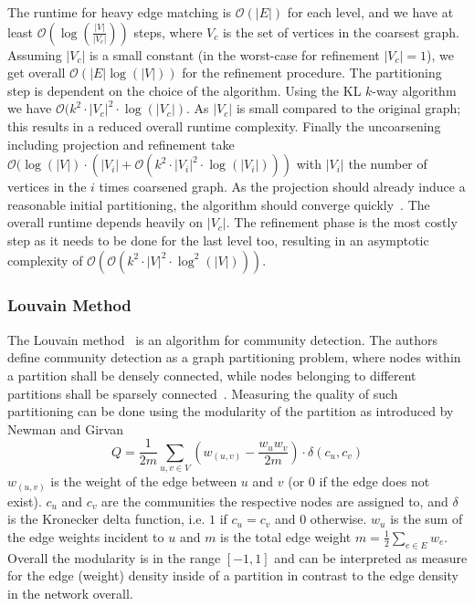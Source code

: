                 The runtime for heavy edge matching is $\mathcal{O}(|E|)$ for each level, and we have at least $\mathcal{O}(\log(\frac{|V|}{|V_c|}))$ steps, where $V_c$ is the set of vertices in the coarsest graph. 
                Assuming $|V_c|$ is a small constant (in the worst-case for refinement $|V_c| = 1$), we get overall $\mathcal{O}(|E| \log(|V|))$ for the refinement procedure.
                The partitioning step is dependent on the choice of the algorithm.
                Using the KL $k$-way algorithm we have  $\mathcal{O}(k^2 \cdot |V_c|^2 \cdot \log(|V_c|)$. As $|V_c|$ is small compared to the original graph; this results in a reduced overall runtime complexity.
                Finally the uncoarsening including projection and refinement take $\mathcal{O}(\log(|V|) \cdot (|V_i| + \mathcal{O}(k^2 \cdot |V_i|^2 \cdot \log(|V_i|)))$ with $|V_i|$ the number of vertices in the $i$ times coarsened graph.  
                As the projection should already induce a reasonable initial partitioning, the algorithm should converge quickly~\autocite{hendrickson1995multi}.
                The overall runtime depends heavily on $|V_c|$. 
                The refinement phase is the most costly step as it needs to be done for the last level too, resulting in an asymptotic complexity of $\mathcal{O}(\mathcal{O}(k^2 \cdot |V|^2 \cdot \log^2(|V|)))$.
                
            \subsubsection*{Louvain Method}\label{louvain-desc}
                The Louvain method~\autocite{blondel2008fast} is an algorithm for community detection. 
                The authors define community detection as a graph partitioning problem, where nodes within a partition shall be densely connected, while nodes belonging to different partitions shall be sparsely connected~\autocite{blondel2008fast}.
                Measuring the quality of such partitioning can be done using the modularity of the partition as introduced by Newman and Girvan~\autocite{girvan2002community}
                \[ Q = \frac{1}{2m} \sum_{u,v \in V} \left( w_{(u, v)} - \frac{w_u w_v}{2m} \right) \cdot \delta (c_u, c_v) \]
                $w_{(u,v)}$ is the weight of the edge between $u$ and $v$ (or $0$ if the edge does not exist). 
                $c_u$ and $c_v$ are the communities the respective nodes are assigned to, and $\delta$ is the Kronecker delta function, i.e. $1$ if $c_u = c_v$ and $0$ otherwise. 
                $w_u$ is the sum of the edge weights incident to $u$ and $m$ is the total edge weight $m = \frac{1}{2} \sum_{e \in E} w_e$.
                Overall the modularity is in the range $[-1, 1]$ and can be interpreted as measure for the edge (weight) density inside of a partition in contrast to the edge density in the network overall.
                
